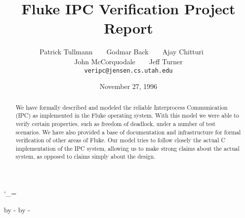 %
%

     

\catcode`\_=\active 

\long{}
\long{}


\topmargin 0pt
\advance \topmargin by -\headheight
\advance \topmargin by -\headsep
\textheight 8.9in
\oddsidemargin 0.3in  
\evensidemargin \oddsidemargin
\marginparwidth 0.5in
\textwidth 6in

%

\title{\bf \Large Fluke IPC Verification Project Report}

\author{Patrick Tullmann~~~~Godmar Back~~~~Ajay Chitturi~~~~\\
        John McCorquodale~~~~Jeff Turner\\[2ex]
        {\tt veripc@jensen.cs.utah.edu}
        }

\date{November 27, 1996}



\maketitle

%
%

\begin{abstract}
    We have formally described and modeled the reliable Interprocess 
    Communication (IPC) as implemented in the Fluke operating 
    system\cite{ford+:osdi96}. With this model we were able to verify
    certain properties, such as freedom of deadlock, under a number of
    test scenarios.  We have also provided a base of documentation and
    infrastructure for formal verification of other areas of Fluke.
    Our model tries to follow closely the actual C implementation
    of the IPC system, allowing us to make strong claims about 
    the actual system, as opposed to claims simply about the design.
\end{abstract}

\tableofcontents
\newpage











%
\appendix







